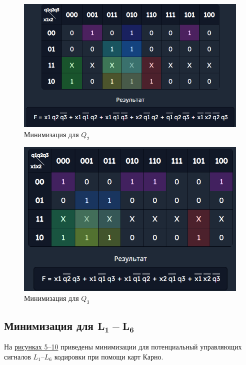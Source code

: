 \documentclass[11pt,a4paper,final]{article} %
\begin{document}
\begin{figure}[H]
	\centering
	\includegraphics[width=0.9 \linewidth]{img/Q2.png}
	\caption{Минимизация для $Q_2$}
	\label{fig:Q2}
\end{figure}

\newpage
\begin{figure}[H]
	\centering
	\includegraphics[width=0.9 \linewidth]{img/Q3.png}
	\caption{Минимизация для $Q_3$}
	\label{fig:Q3}
\end{figure}


\subsection{Минимизация для $\mathbf{L_1-L_6}$}

На \hyperref[fig:L1]{рисунках 5--10} приведены минимизации для потенциальный управляющих сигналов $L_1$--$L_6$ кодировки при помощи карт Карно.
\end{document}
